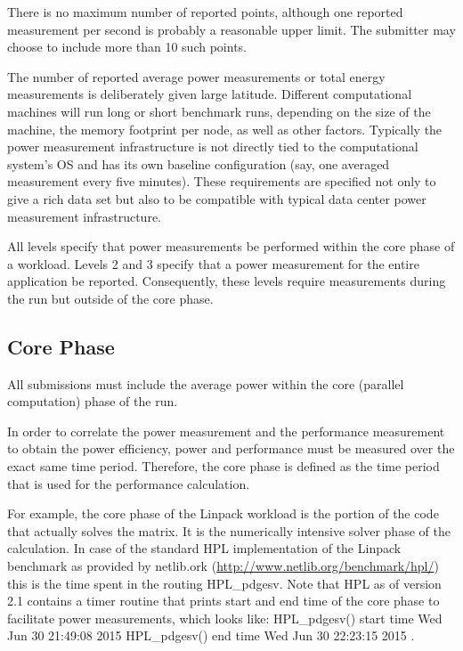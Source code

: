 \noindent
There is no maximum number of reported points, although one reported measurement per second is probably a reasonable upper limit. The submitter may choose to include more than 10 such points.
\wl

\noindent
The number of reported average power measurements or total energy measurements is deliberately given large latitude.  Different computational machines will run long or short benchmark runs, depending on the size of the machine, the memory footprint per node, as well as other factors.  Typically the power measurement infrastructure is not directly tied to the computational system's OS and has its own baseline configuration (say, one averaged measurement every five minutes).  These requirements are specified not only to give a rich data set but also to be compatible with typical data center power measurement infrastructure.
\wl

\noindent
All levels specify that power measurements be performed within the core phase of a workload. Levels 2 and 3 specify that a power measurement for the entire application be reported. Consequently, these levels require measurements during the run but outside of the core phase.

\subsection{Core Phase}
\label{sec:core_phase}
\noindent
All submissions must include the average power within the core (parallel computation) phase of the run. 
\wl

\noindent
In order to correlate the power measurement and the performance measurement to obtain the power efficiency, power and performance must be measured over the exact same time period.
Therefore, the core phase is defined as the time period that is used for the performance calculation.
\wl

\noindent
For example, the core phase of the Linpack workload is the portion of the code that actually solves the matrix.
It is the numerically intensive solver phase of the calculation.
In case of the standard HPL implementation of the Linpack benchmark as provided by netlib.ork (\url{http://www.netlib.org/benchmark/hpl/}) this is the time spent in the routing {\ttfamily HPL\_pdgesv}.
Note that HPL as of version 2.1 contains a timer routine that prints start and end time of the core phase to facilitate power measurements, which looks like:\newline
{\ttfamily
HPL\_pdgesv() start time Wed Jun 30 21:49:08 2015\newline
HPL\_pdgesv() end time Wed Jun 30 22:23:15 2015
}.

